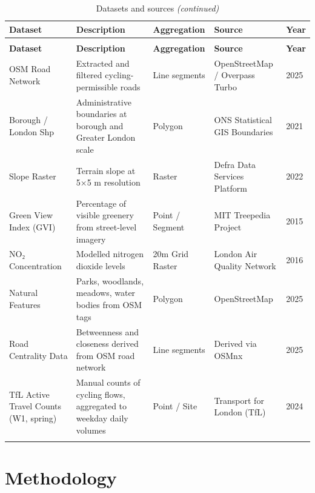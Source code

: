 \documentclass[
  12pt,
  oneside]{book}
\begin{document}
\begin{longtable}[t]{>{\raggedright\arraybackslash}p{2.0cm}>{\raggedright\arraybackslash}p{5.0cm}>{\raggedright\arraybackslash}p{2.2cm}>{\raggedright\arraybackslash}p{2.2cm}l}
\caption{\label{tab:datasource}Datasets and sources}\\
\toprule
\textbf{Dataset} & \textbf{Description} & \textbf{Aggregation} & \textbf{Source} & \textbf{Year}\\
\midrule
\endfirsthead
\caption[]{\label{tab:datasource}Datasets and sources \textit{(continued)}}\\
\toprule
\textbf{Dataset} & \textbf{Description} & \textbf{Aggregation} & \textbf{Source} & \textbf{Year}\\
\midrule
\endhead

\endfoot
\bottomrule
\endlastfoot
OSM Road Network & Extracted and filtered cycling-permissible roads & Line segments & OpenStreetMap / Overpass Turbo & 2025\\
Borough / London Shp & Administrative boundaries at borough and Greater London scale & Polygon & ONS Statistical GIS Boundaries & 2021\\
Slope Raster & Terrain slope at 5×5 m resolution & Raster & Defra Data Services Platform & 2022\\
Green View Index (GVI) & Percentage of visible greenery from street-level imagery & Point / Segment & MIT Treepedia Project & 2015\\
NO₂ Concentration & Modelled nitrogen dioxide levels & 20m Grid Raster & London Air Quality Network & 2016\\
\addlinespace
Natural Features & Parks, woodlands, meadows, water bodies from OSM tags & Polygon & OpenStreetMap & 2025\\
Road Centrality Data & Betweenness and closeness derived from OSM road network & Line segments & Derived via OSMnx & 2025\\
TfL Active Travel Counts (W1, spring) & Manual counts of cycling flows, aggregated to weekday daily volumes & Point / Site & Transport for London (TfL) & 2024\\*
\end{longtable}
\endgroup{}

\chapter{Methodology}\label{methodology}
\end{document}
